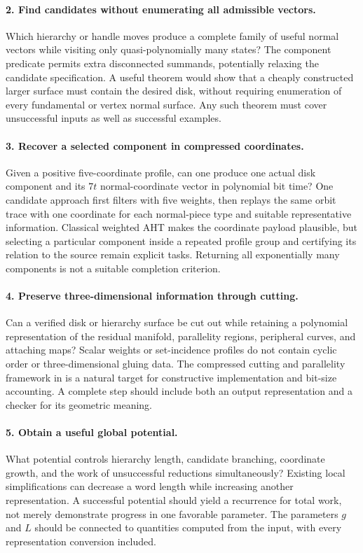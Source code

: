 \paragraph{2. Find candidates without enumerating all admissible vectors.}
Which hierarchy or handle moves produce a complete family of useful normal
vectors while visiting only quasi-polynomially many states?  The component
predicate permits extra disconnected summands, potentially relaxing the
candidate specification.  A useful theorem would show that a cheaply
constructed larger surface must contain the desired disk, without requiring
enumeration of every fundamental or vertex normal surface.  Any such theorem
must cover unsuccessful inputs as well as successful examples.

\paragraph{3. Recover a selected component in compressed coordinates.}
Given a positive five-coordinate profile, can one produce one actual disk
component and its $7t$ normal-coordinate vector in polynomial bit time?
One candidate approach first filters with five weights, then replays the
same orbit trace with one coordinate for each normal-piece type and suitable
representative information.  Classical weighted AHT makes the coordinate
payload plausible, but selecting a particular component inside a repeated
profile group and certifying its relation to the source remain explicit
tasks.  Returning all exponentially many components is not a suitable
completion criterion.

\paragraph{4. Preserve three-dimensional information through cutting.}
Can a verified disk or hierarchy surface be cut out while retaining a
polynomial representation of the residual manifold, parallelity regions,
peripheral curves, and attaching maps?  Scalar weights or set-incidence
profiles do not contain cyclic order or three-dimensional gluing data.
The compressed cutting and parallelity framework in
\cite[Theorem~14.4]{Lackenby2026} is a natural target for constructive
implementation and bit-size accounting.  A complete step should include
both an output representation and a checker for its geometric meaning.

\paragraph{5. Obtain a useful global potential.}
What potential controls hierarchy length, candidate branching, coordinate
growth, and the work of unsuccessful reductions simultaneously?  Existing
local simplifications can decrease a word length while increasing another
representation.  A successful potential should yield a recurrence for total
work, not merely demonstrate progress in one favorable parameter.  The
parameters $g$ and $L$ should be connected to quantities computed from the
input, with every representation conversion included.

